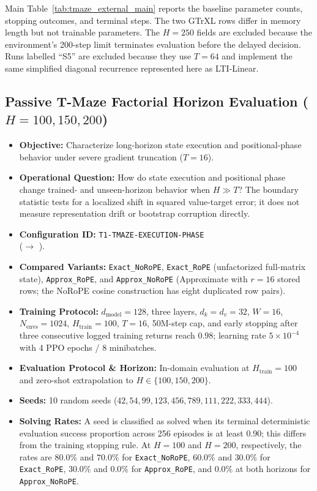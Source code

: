 Main Table~\ref{tab:tmaze_external_main} reports the baseline parameter counts, stopping outcomes, and terminal steps. The two GTrXL rows differ in memory length but not trainable parameters. The $H=250$ fields are excluded because the environment's 200-step limit terminates evaluation before the delayed decision. Runs labelled ``S5'' are excluded because they use $T=64$ and implement the same simplified diagonal recurrence represented here as LTI-Linear.

\subsection{Passive T-Maze Factorial Horizon Evaluation \texorpdfstring{($H=100,150,200$)}{(H=100,150,200)}}
\begin{itemize}
    \item \textbf{Objective:} Characterize long-horizon state execution and positional-phase behavior under severe gradient truncation ($T=16$).
    \item \textbf{Operational Question:} How do state execution and positional phase change trained- and unseen-horizon behavior when $H\gg T$? The boundary statistic tests for a localized shift in squared value-target error; it does not measure representation drift or bootstrap corruption directly.
    \item \textbf{Configuration ID:} \texttt{T1-TMAZE-EXECUTION-PHASE} \\ ($\to$ ).
    \item \textbf{Compared Variants:} \texttt{Exact\_NoRoPE}, \texttt{Exact\_RoPE} (unfactorized full-matrix state), \texttt{Approx\_RoPE}, and \texttt{Approx\_NoRoPE} (Approximate with $r=16$ stored rows; the NoRoPE cosine construction has eight duplicated row pairs).
    \item \textbf{Training Protocol:} $d_{\text{model}}=128$, three layers, $d_k=d_v=32$, $W=16$, $N_{\text{envs}}=1024$, $H_{\text{train}}=100$, $T=16$, 50M-step cap, and early stopping after three consecutive logged training returns reach $0.98$; learning rate $5\times 10^{-4}$ with 4 PPO epochs / 8 minibatches.
    \item \textbf{Evaluation Protocol \& Horizon:} In-domain evaluation at $H_{\text{train}}=100$ and zero-shot extrapolation to $H \in \{100, 150, 200\}$.
    \item \textbf{Seeds:} 10 random seeds ($42, 54, 99, 123, 456, 789, 111, 222, 333, 444$).
    \item \textbf{Solving Rates:} A seed is classified as solved when its terminal deterministic evaluation success proportion across 256 episodes is at least $0.90$; this differs from the training stopping rule. At $H=100$ and $H=200$, respectively, the rates are $80.0\%$ and $70.0\%$ for \texttt{Exact\_NoRoPE}, $60.0\%$ and $30.0\%$ for \texttt{Exact\_RoPE}, $30.0\%$ and $0.0\%$ for \texttt{Approx\_RoPE}, and $0.0\%$ at both horizons for \texttt{Approx\_NoRoPE}.

\end{itemize}

